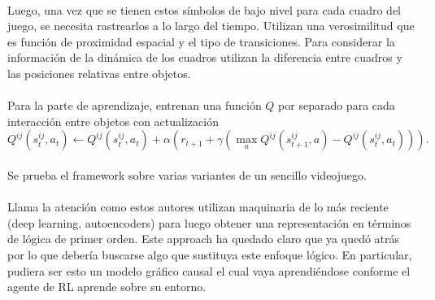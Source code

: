 \documentclass[11pt]{article}
\theoremstyle{plain}
\begin{document}
\\
Luego, una vez que se tienen estos símbolos de bajo nivel para cada cuadro del juego, se necesita rastrearlos a lo largo del tiempo. Utilizan una verosimilitud que es función de proximidad espacial y el tipo de transiciones. Para considerar la información de la dinámica de los cuadros utilizan la diferencia entre cuadros y las posiciones relativas entre objetos.\\
\\
Para la parte de aprendizaje, entrenan una función $Q$ por separado para cada interacción entre objetos con actualización
\[Q^{ij}(s_t^{ij},a_t) \leftarrow  Q^{ij}(s_t^{ij},a_t) + \alpha \left( r_{t+1} + \gamma (\max_{a} Q^{ij} (s_{t+1}^{ij},a) - Q^{ij}(s_t^{ij},a_t)) \right). \]
\\
Se prueba el framework sobre varias variantes de un sencillo videojuego. \\
\\
Llama la atención como estos autores utilizan maquinaria de lo más reciente (deep learning, autoencoders) para luego obtener una representación en términos de lógica de primer orden. Este approach ha quedado claro que ya quedó atrás por lo que debería buscarse algo que sustituya este enfoque lógico. En particular, pudiera ser esto un modelo gráfico causal el cual vaya aprendiéndose conforme el agente de RL aprende sobre su entorno.
\end{document}
